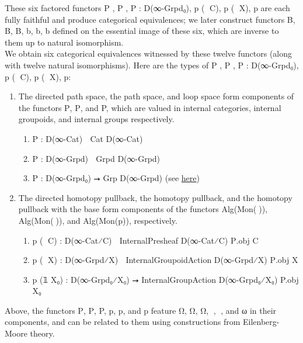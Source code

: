 \documentclass{book}
\theoremstyle{definition}
\begin{document}
These six factored functors P⃗ , P⃡ , P : D(∞-Grpd₀), p⃗ (𝟙 C), p⃡ (𝟙 X), p are each fully faithful and produce categorical equivalences; we later construct functors B⃗, B⃡, B, b⃗, b⃡, b defined on the essential image of these six, which are inverse to them up to natural isomorphism.\\

We obtain six categorical equivalences witnessed by these twelve functors (along with twelve natural isomorphisms). Here are the types of P⃗ , P⃡ , P : D(∞-Grpd₀), p⃗ (𝟙 C), p⃡ (𝟙 X), p:

\begin{enumerate}
\item The directed path space, the path space, and loop space form components of the functors P⃗, P⃡, and P, which are valued in internal categories, internal groupoids, and internal groups respectively.
\begin{enumerate}
\item P⃗ : D(∞-Cat) ⭢ Cat D(∞-Cat)
\item P⃡ : D(∞-Grpd) ⭢ Grpd D(∞-Grpd)
\item P : D(∞-Grpd₀) ⭢ Grp D(∞-Grpd) (see \href{https://mathoverflow.net/questions/128883/why-omega-x-and-bg-are-adjoint-functors}{here})
\end{enumerate}
\item The directed homotopy pullback, the homotopy pullback, and the homotopy pullback with the base form components of the functors Alg(Mon(ω⃗)), Alg(Mon(ω⃡)), and Alg(Mon(p)), respectively. 
\begin{enumerate}
\item p⃗ (𝟙 C) : D(∞-Cat⁄C) ⭢ InternalPresheaf D(∞-Cat⁄C) P⃗.obj C 
\item p⃡ (𝟙 X) : D(∞-Grpd⁄X) ⭢ InternalGroupoidAction D(∞-Grpd⁄X) P⃡.obj X
\item p (𝟙 X₀) : D(∞-Grpd₀⁄X₀) ⭢ InternalGroupAction D(∞-Grpd₀⁄X₀) P.obj X₀
\end{enumerate}
\end{enumerate}

Above, the functors P⃗, P⃡, P, p⃗, p⃡, and p feature Ω⃗, Ω⃡, Ω, ω⃗, ω⃡, and ω in their components, and can be related to them using constructions from Eilenberg-Moore theory.\\
\fi
\end{document}
